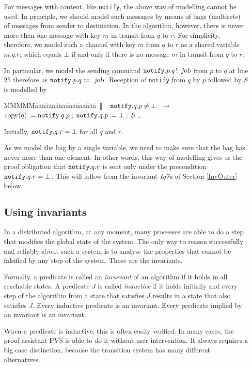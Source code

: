 \documentclass[10pt]{article} \usepackage[english]{babel}
\newenvironment{tab}{\begin{tabbing}
MMMMM\=aaa\=aaa\=aaa\=aaa\=aaa\=aaa\= \kill}{\end{tabbing}}
\def\bar   {\mbox{$\,[ \! ]\,$}}
\def\S #1/{\mbox {\textsl{#1}}}
\def\T #1/{\mbox {\texttt{#1}}}
\def\TO     {\mbox{$\quad\to\quad$}}
\begin{document}
For messages with content, like \T notify/, the above way of modelling
cannot be used.  In principle, we should model such messages by means
of bags (multisets) of messages from sender to destination. In the
algorithm, however, there is never more than one message with key $m$
in transit from $q$ to $r$. For simplicity, therefore, we model such a
channel with key $m$ from $q$ to $r$ as a shared variable $m.q.r$,
which equals $\bot$ if and only if there is no message $m$ in transit
from $q$ to $r$.

In particular, we model the sending command $\T notify/.p.q\,!\:\S
job/$ from $p$ to $q$ at line 25 therefore as $\T notify/.p.q := \S
job/$.  Reception of \T notify/ from $q$ by $p$ followed by $S$ is
modelled by
\begin{tab}
\> $\bar\quad \T notify/.q.p \ne \bot \TO $\+\+ \\
$ \S copy/(q) := \T notify/.q.p \;;\; \T notify/.q.p:= \bot\;;\; S $ .
\end{tab}
Initially, $\T notify/.q.r = \bot$ for all $q$ and $r$. 

As we model the bag by a single variable, we need to make sure that
the bag has never more than one element.  In other words, this way of
modelling gives us the proof obligation that $\T notify/.q.r$ is sent
only under the precondition $\T notify/.q.r = \bot\,$.  This will
follow from the invariant \S Iq7a/ of Section \ref {InvOuter} below.

\subsection{Using invariants} \label{safety}

In a distributed algorithm, at any moment, many processes are able to
do a step that modifies the global state of the system. The only way
to reason successfully and reliably about such a system is to analyse
the properties that cannot be falsified by any step of the
system. These are the invariants.

Formally, a predicate is called an \emph{invariant} of an algorithm if
it holds in all reachable states.  A predicate $J$ is called
\emph{inductive} if it holds initially and every step of the algorithm
from a state that satisfies $J$ results in a state that also satisfies
$J$.  Every inductive predicate is an invariant. Every predicate
implied by an invariant is an invariant.

When a predicate is inductive, this is often easily verified. In many
cases, the proof assistant PVS is able to do it without user
intervention. It always requires a big case distinction, because the
transition system has many different alternatives.
\end{document}
